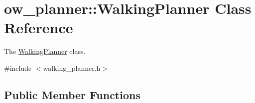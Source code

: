 \hypertarget{classow__planner_1_1WalkingPlanner}{}\section{ow\+\_\+planner\+:\+:Walking\+Planner Class Reference}
\label{classow__planner_1_1WalkingPlanner}


The \hyperlink{classow__planner_1_1WalkingPlanner}{Walking\+Planner} class.  




{\ttfamily \#include $<$walking\+\_\+planner.\+h$>$}

\subsection*{Public Member Functions}
